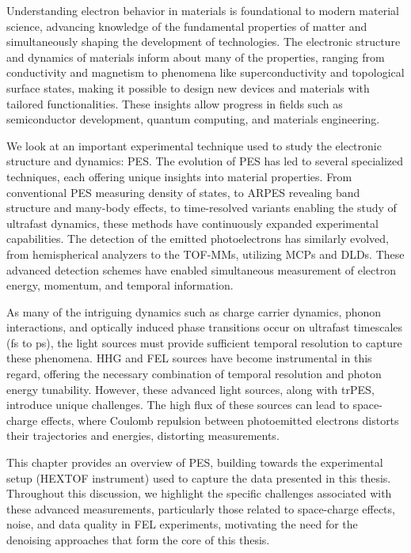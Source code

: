 
Understanding electron behavior in materials is foundational to modern material science, advancing knowledge of the fundamental properties of matter and simultaneously shaping the development of technologies. The electronic structure and dynamics of materials inform about many of the properties, ranging from conductivity and magnetism to phenomena like superconductivity and topological surface states, making it possible to design new devices and materials with tailored functionalities. These insights allow progress in fields such as semiconductor development, quantum computing, and materials engineering.

We look at an important experimental technique used to study the electronic structure and dynamics: \gls{PES}. The evolution of \gls{PES} has led to several specialized techniques, each offering unique insights into material properties. From conventional \gls{PES} measuring density of states, to \gls{ARPES} revealing band structure and many-body effects, to time-resolved variants enabling the study of ultrafast dynamics, these methods have continuously expanded experimental capabilities. The detection of the emitted photoelectrons has similarly evolved, from hemispherical analyzers to the \gls{TOF}-\glspl{MM}, utilizing \glspl{MCP} and \glspl{DLD}. These advanced detection schemes have enabled simultaneous measurement of electron energy, momentum, and temporal information.

As many of the intriguing dynamics such as charge carrier dynamics, phonon interactions, and optically induced phase transitions occur on ultrafast timescales (\unit{fs} to \unit{ps}), the light sources must provide sufficient temporal resolution to capture these phenomena. \Gls{HHG} and \gls{FEL} sources have become instrumental in this regard, offering the necessary combination of temporal resolution and photon energy tunability. However, these advanced light sources, along with \gls{trPES}, introduce unique challenges. The high flux of these sources can lead to space-charge effects, where Coulomb repulsion between photoemitted electrons distorts their trajectories and energies, distorting measurements.

This chapter provides an overview of \gls{PES}, building towards the experimental setup (HEXTOF instrument) used to capture the data presented in this thesis. Throughout this discussion, we highlight the specific challenges associated with these advanced measurements, particularly those related to space-charge effects, noise, and data quality in \gls{FEL} experiments, motivating the need for the denoising approaches that form the core of this thesis.

